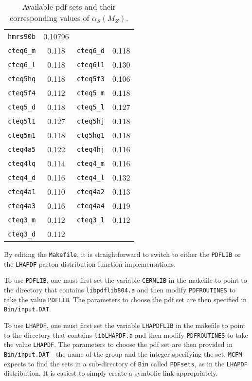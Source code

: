 \documentclass[12pt]{article}
\begin{document}
\begin{table}[h]
\begin{center}
\begin{tabular}{|c|c||c|c|}
{\tt hmrs90b}  &  0.10796     \\
{\tt cteq6\_m} &  0.118       &
{\tt cteq6\_d} &  0.118       \\
{\tt cteq6\_l} &  0.118       &
{\tt cteq6l1}  &  0.130       \\
{\tt cteq5hq}  &  0.118       &
{\tt cteq5f3}  &  0.106       \\
{\tt cteq5f4}  &  0.112       &
{\tt cteq5\_m} &  0.118       \\
{\tt cteq5\_d} &  0.118       & 
{\tt cteq5\_l} &  0.127       \\ 
{\tt cteq5l1}  &  0.127       & 
{\tt cteq5hj}  &  0.118       \\
{\tt cteq5m1}  &  0.118       &
{\tt ctq5hq1}  &  0.118       \\
{\tt cteq4a5}  &  0.122       &
{\tt cteq4hj}  &  0.116       \\
{\tt cteq4lq}  &  0.114       &
{\tt cteq4\_m} &  0.116       \\
{\tt cteq4\_d} &  0.116       &
{\tt cteq4\_l} &  0.132       \\
{\tt cteq4a1}  &  0.110       &
{\tt cteq4a2}  &  0.113       \\
{\tt cteq4a3}  &  0.116       &
{\tt cteq4a4}  &  0.119       \\
{\tt cteq3\_m} &  0.112       &
{\tt cteq3\_l} &  0.112       \\
{\tt cteq3\_d} &  0.112       & \\
\hline
\end{tabular}
\end{center}
\caption{Available pdf sets and their corresponding values of
$\alpha_S(M_Z)$.}
\label{pdlabel}
\end{table}

By editing the {\tt Makefile}, it is straightforward to switch to
either the {\tt PDFLIB} or the {\tt LHAPDF} parton distribution
function implementations.

To use {\tt PDFLIB}, one must first set the variable {\tt CERNLIB}
in the makefile to point to the directory that contains
{\tt libpdflib804.a} and then modify {\tt PDFROUTINES} to
take the value {\tt PDFLIB}. The parameters to choose the
pdf set are then specified in {\tt Bin/input.DAT}.

To use {\tt LHAPDF}, one must first set the variable {\tt LHAPDFLIB}
in the makefile to point to the directory that contains
{\tt libLHAPDF.a} and then modify {\tt PDFROUTINES} to
take the value {\tt LHAPDF}. The parameters to choose the
pdf set are then provided in {\tt Bin/input.DAT} - 
the name of the group and the integer specifying 
the set.
{\tt MCFM} expects to find the sets in a sub-directory of {\tt Bin} called
{\tt PDFsets}, as in the {\tt LHAPDF} distribution. It is easiest to
simply create a symbolic link appropriately.
\end{document}
